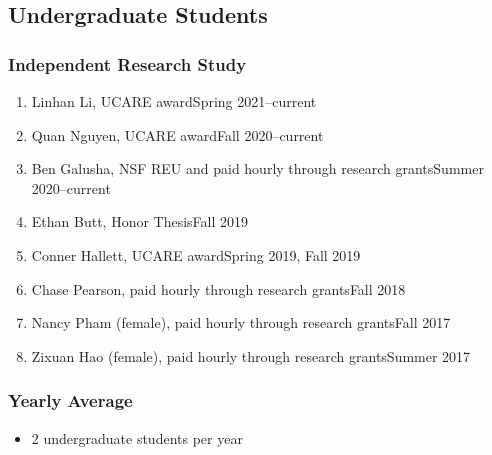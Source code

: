 \documentclass[11pt]{article}
\begin{document}
{  %

  \subsection{Undergraduate Students}
  \subsubsection{Independent Research Study}

  \begin{enumerate}
    \kimhao{}
    \maxnguyen{}    
  \item Linhan Li, UCARE award\hfill Spring 2021--current 
  \item Quan Nguyen, UCARE award\hfill Fall 2020--current
  \item Ben Galusha, NSF REU and paid hourly through research grants\hfill Summer 2020--current
  \item Ethan Butt, Honor Thesis\hfill Fall 2019 
  \item Conner Hallett, UCARE award\hfill Spring 2019, Fall 2019
  \item Chase Pearson, paid hourly through research grants\hfill Fall 2018 
  \item Nancy Pham (female),  paid hourly through research grants\hfill Fall 2017
  \item Zixuan Hao (female), paid hourly through research grants\hfill Summer 2017 
  \end{enumerate}

  \subsubsection{Yearly Average}
  \begin{itemize}
  \item 2 undergraduate students per year  %
  \end{itemize}


}
\end{document}
